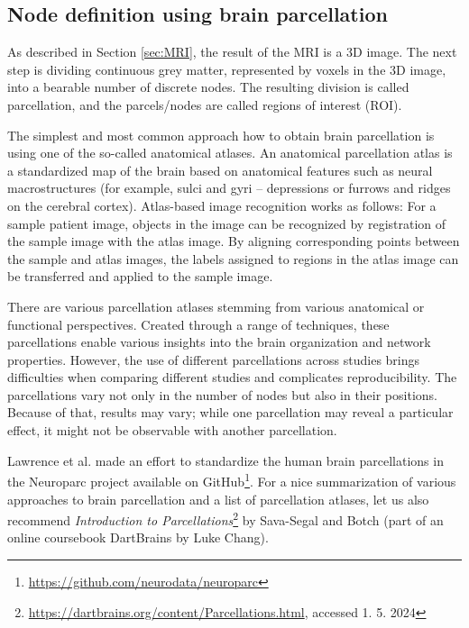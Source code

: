 \subsection{Node definition using brain parcellation}

As described in Section \ref{sec:MRI}, the result of the MRI is a 3D image. The next step is dividing continuous grey matter, represented by voxels in the 3D image, into a bearable number of discrete nodes. The resulting division is called parcellation, and the parcels/nodes are called regions of interest (ROI). 

The simplest and most common approach how to obtain brain parcellation is using one of the so-called anatomical atlases. An anatomical parcellation atlas is a standardized map of the brain based on anatomical features such as neural macrostructures (for example, sulci and gyri -- depressions or furrows and ridges on the cerebral cortex). Atlas-based image recognition works as follows: For a sample patient image, objects in the image can be recognized by registration of the sample image with the atlas image. By aligning corresponding points between the sample and atlas images, the labels assigned to regions in the atlas image can be transferred and applied to the sample image. \cite{sotiropoulos_building_2019, lawrence_standardizing_2021,chang_ljchangdartbrains_2020,rohrer_focused_2008} 

There are various parcellation atlases stemming from various anatomical or functional perspectives. Created through a range of techniques, these parcellations enable various insights into the brain organization and network properties. However, the use of different parcellations across studies brings difficulties when comparing different studies and complicates reproducibility. The parcellations vary not only in the number of nodes but also in their positions. Because of that, results may vary; while one parcellation may reveal a particular effect, it might not be observable with another parcellation.  \cite{sotiropoulos_building_2019, lawrence_standardizing_2021}

Lawrence et al. made an effort to standardize the human brain parcellations in the Neuroparc project available on GitHub\footnote{\url{https://github.com/neurodata/neuroparc}}. For a nice summarization of various approaches to brain parcellation and a list of parcellation atlases, let us also recommend \textit{Introduction to Parcellations}\footnote{\url{https://dartbrains.org/content/Parcellations.html}, accessed 1. 5. 2024} by Sava-Segal and Botch (part of an online coursebook DartBrains by Luke Chang). \cite{chang_ljchangdartbrains_2020}

